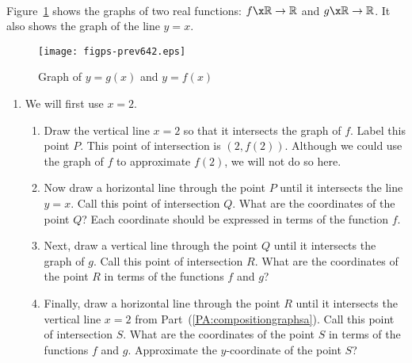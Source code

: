 \begin{previewactivity} \label{PA:compositiongraphs} \hfill \\
Figure~\ref{fig:functioncomposition} shows the graphs of two real functions:  
$f\x \mathbb{R} \to \mathbb{R}$  and  $g\x \mathbb{R} \to \mathbb{R}$.  It also shows the graph of the line  $y = x$.
\begin{figure}[h]
\begin{center}
\texttt{[image: figps-prev642.eps]}
\caption{Graph of $y = g( x )$ and  $y = f( x )$} 
\label{fig:functioncomposition}
\end{center}
\end{figure}

%
\begin{enumerate}
\item We will first use  $x = 2$. \label{PA:compositiongraphs1}
\begin{enumerate}
  \item Draw the vertical line  $x = 2$  so that it intersects the graph of  $f$.  Label this point  $P$.  This point of intersection is  $( {2, f( 2 )} )$.  Although we could use the graph of  $f$  to approximate  $f( 2 )$, we will not do so here.
\label{PA:compositiongraphsa}

  \item Now draw a horizontal line through the point  $P$  until it intersects the  line  
$y = x$.  Call this point of intersection  $Q$.  What are the coordinates of the point  $Q$?  Each coordinate should be expressed in terms of the function  $f$\!.

  \item Next, draw a vertical line through the point  $Q$  until it intersects the graph of  
$g$.  Call this point of intersection  $R$.  What are the coordinates of the point  $R$  in terms of the functions  $f$  and  $g$?

  \item Finally, draw a horizontal line through the point  $R$  until it intersects the vertical line  $x = 2$ from Part~(\ref{PA:compositiongraphsa}).  Call this point of intersection  $S$.  What are the coordinates of the point  $S$  in terms of the functions  $f$  and  $g$.  Approximate the $y$-coordinate of the point  $S$?
\end{enumerate}


\end{enumerate}
\end{previewactivity}
